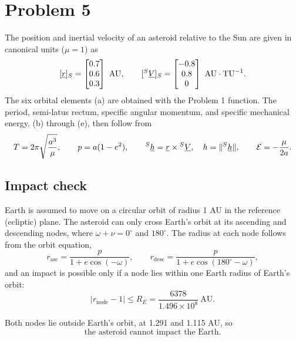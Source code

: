 \section{Problem 5}
\label{sec:problem5}

The position and inertial velocity of an asteroid relative to the Sun are given in canonical units ($\mu=1$) as
\[
[\vect{r}]_S = \begin{bmatrix} 0.7 \\ 0.6 \\ 0.3 \end{bmatrix}\ \text{AU}, \qquad
[{}^{S}\vect{V}]_S = \begin{bmatrix} -0.8 \\ 0.8 \\ 0 \end{bmatrix}\ \text{AU}\cdot\text{TU}^{-1}.
\]
The six orbital elements (a) are obtained with the Problem 1 function. The period, semi-latus rectum, specific angular momentum, and specific mechanical energy, (b) through (e), then follow from
\begin{equation}
T = 2\pi\sqrt{\frac{a^3}{\mu}}, \qquad
p = a(1-e^2), \qquad
{}^{S}\underline{h} = \underline{r}\times{}^{S}\underline{V}, \quad h = \|{}^{S}\underline{h}\|, \qquad
\mathcal{E} = -\frac{\mu}{2a}.
\end{equation}

\subsection*{Impact check}

Earth is assumed to move on a circular orbit of radius 1 AU in the reference (ecliptic) plane. The asteroid can only cross Earth's orbit at its ascending and descending nodes, where $\omega+\nu = 0^\circ$ and $180^\circ$. The radius at each node follows from the orbit equation,
\begin{equation}
r_{\text{asc}} = \frac{p}{1+e\cos(-\omega)}, \qquad
r_{\text{desc}} = \frac{p}{1+e\cos(180^\circ-\omega)},
\end{equation}
and an impact is possible only if a node lies within one Earth radius of Earth's orbit:
\begin{equation}
\left|r_{\text{node}} - 1\right| \le R_E = \frac{6378}{1.496\times10^{8}}\ \text{AU}.
\end{equation}


\noindent Both nodes lie outside Earth's orbit, at 1.291 and 1.115 AU, so
\begin{equation}
\boxed{\text{the asteroid cannot impact the Earth.}}
\end{equation}

\FloatBarrier
